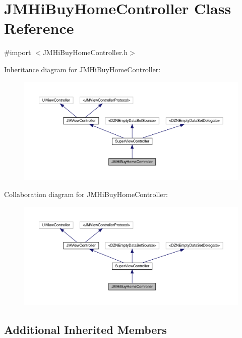 \hypertarget{interface_j_m_hi_buy_home_controller}{}\section{J\+M\+Hi\+Buy\+Home\+Controller Class Reference}
\label{interface_j_m_hi_buy_home_controller}


{\ttfamily \#import $<$J\+M\+Hi\+Buy\+Home\+Controller.\+h$>$}



Inheritance diagram for J\+M\+Hi\+Buy\+Home\+Controller\+:\nopagebreak
\begin{figure}[H]
\begin{center}
\leavevmode
\includegraphics[width=350pt]{interface_j_m_hi_buy_home_controller__inherit__graph}
\end{center}
\end{figure}


Collaboration diagram for J\+M\+Hi\+Buy\+Home\+Controller\+:\nopagebreak
\begin{figure}[H]
\begin{center}
\leavevmode
\includegraphics[width=350pt]{interface_j_m_hi_buy_home_controller__coll__graph}
\end{center}
\end{figure}
\subsection*{Additional Inherited Members}


